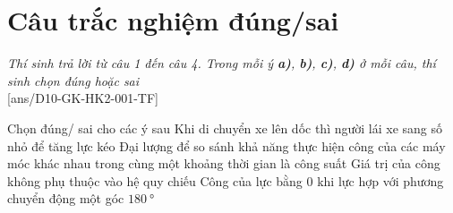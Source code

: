 \section{Câu trắc nghiệm đúng/sai} 
\textit{Thí sinh trả lời từ câu 1 đến câu 4. Trong mỗi ý \textbf{a)}, \textbf{b)}, \textbf{c)}, \textbf{d)} ở mỗi câu, thí sinh chọn đúng hoặc sai}
\setcounter{ex}{0}\\
[ans/D10-GK-HK2-001-TF]
\begin{ex}
	Chọn đúng/ sai cho các ý sau
	\choiceTF
	{\True Khi di chuyển xe lên dốc thì người lái xe sang số nhỏ để tăng lực kéo}
	{\True Đại lượng để so sánh khả năng thực hiện công của các máy móc khác nhau trong cùng một khoảng thời gian là công suất}
	{Giá trị của công không phụ thuộc vào hệ quy chiếu}
	{Công của lực bằng 0 khi lực hợp với phương chuyển động một góc $\SI{180}{\degree}$}
\end{ex}
